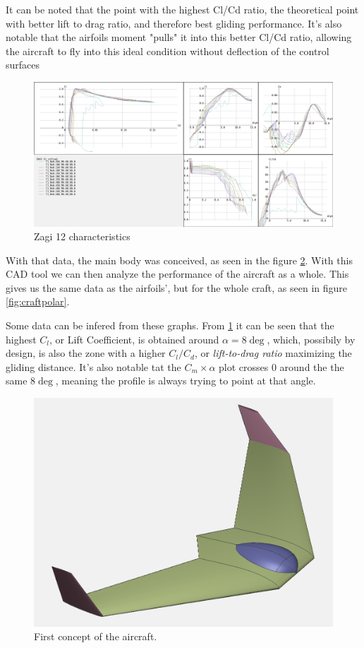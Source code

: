 It can be noted that the point with the highest Cl/Cd ratio, the theoretical point with better lift to drag ratio, and therefore best gliding performance. It's also notable that the airfoils moment "pulls" it into this better Cl/Cd ratio, allowing the aircraft to fly into this ideal condition without deflection of the control surfaces


\begin{figure}
\centering
  \includegraphics[width=\linewidth]{figs/polares.png}
  \caption{Zagi 12 characteristics}
  \label{fig:zagi12polares}
\end{figure}

With that data, the main body was conceived, as seen in the figure \ref{fig:preliminar}. With this CAD tool we can then analyze the performance of the aircraft as a whole. This gives us the same data as the airfoils', but for the whole craft, as seen in figure \ref{fig:craftpolar}.

Some data can be infered from these graphs. From \ref{fig:zagi12polares} it can be seen that the highest $C_l$, or Lift Coefficient, is obtained around $\alpha = 8\deg$, which, possibily by design, is also the zone with a higher $C_l/C_d$, or \textit{lift-to-drag ratio} maximizing the gliding distance. It's also notable tat the $C_m  \times \alpha$ plot crosses 0 around the the same $8\deg$, meaning the profile is always trying to point at that angle.

\begin{figure}
\centering
  \includegraphics[width=\linewidth]{figs/preliminar.png}
  \caption{First concept of the aircraft.}
  \label{fig:preliminar}
\end{figure}


